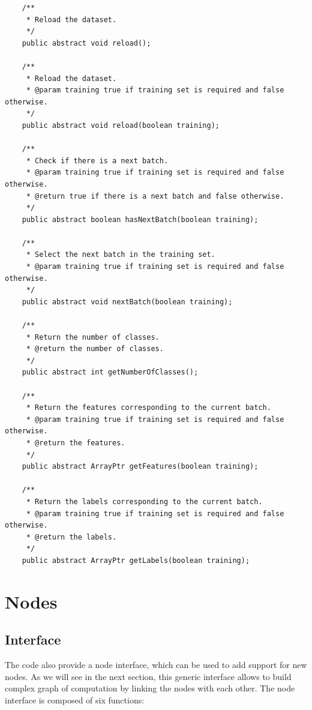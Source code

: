 \documentclass[11pt]{report}
\begin{document}
\begin{verbatim}
    /**
     * Reload the dataset.
     */
    public abstract void reload();

    /**
     * Reload the dataset.
     * @param training true if training set is required and false otherwise.
     */
    public abstract void reload(boolean training);

    /**
     * Check if there is a next batch.
     * @param training true if training set is required and false otherwise.
     * @return true if there is a next batch and false otherwise.
     */
    public abstract boolean hasNextBatch(boolean training);

    /**
     * Select the next batch in the training set.
     * @param training true if training set is required and false otherwise.
     */
    public abstract void nextBatch(boolean training);

    /**
     * Return the number of classes.
     * @return the number of classes.
     */
    public abstract int getNumberOfClasses();

    /**
     * Return the features corresponding to the current batch.
     * @param training true if training set is required and false otherwise.
     * @return the features.
     */
    public abstract ArrayPtr getFeatures(boolean training);

    /**
     * Return the labels corresponding to the current batch.
     * @param training true if training set is required and false otherwise.
     * @return the labels.
     */
    public abstract ArrayPtr getLabels(boolean training);
\end{verbatim}

\section{Nodes} \label{sec:nodes}

\subsection{Interface}

The code also provide a node interface, which can be used to add support for new nodes. As we will see in the next section, this generic interface allows to build complex graph of computation by linking the nodes with each other. The node interface is composed of six functions:
\end{document}

